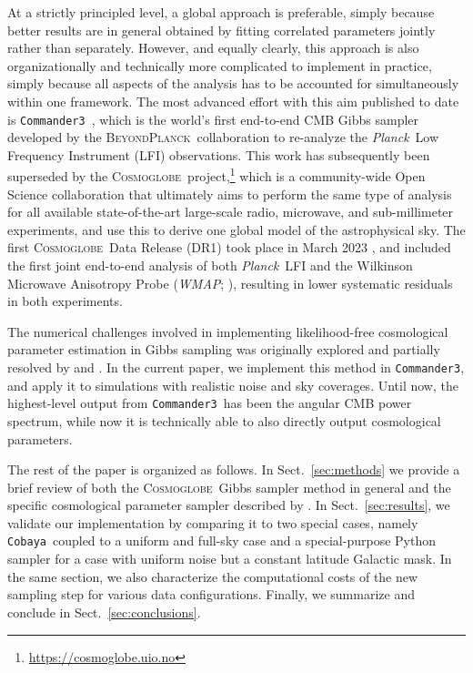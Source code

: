 \documentclass[twocolumn]{../common/aa}
\def\WMAP{\emph{WMAP}}
\def\Planck{\emph{Planck}}
\def\commanderthree{\texttt{Commander3}}
\def\cobaya{\texttt{Cobaya}}
\newcommand{\BP}{\textsc{BeyondPlanck}}
\newcommand{\cosmoglobe}{\textsc{Cosmoglobe}}
\begin{document}
At a strictly principled level, a global approach is preferable, simply because better results are in general obtained by fitting correlated parameters jointly rather than separately. However, and equally clearly, this approach is also organizationally and technically more complicated to implement in practice, simply because all aspects of the analysis has to be accounted for simultaneously within one framework. The most advanced effort with this aim published to date is \commanderthree\ \citep{bp03}, which is the world's first end-to-end CMB Gibbs sampler developed by the \BP\ collaboration to re-analyze the \Planck\ Low Frequency Instrument (LFI) observations. This work has subsequently been superseded by the \cosmoglobe\ project,\footnote{\url{https://cosmoglobe.uio.no}} which is a community-wide Open Science collaboration that ultimately aims to perform the same type of analysis for all available state-of-the-art large-scale radio, microwave, and sub-millimeter experiments, and use this to derive one global model of the astrophysical sky. The first \cosmoglobe\ Data Release (DR1) took place in March 2023 \citep{watts2023_dr1}, and included the first joint end-to-end analysis of both \Planck\ LFI and the Wilkinson Microwave Anisotropy Probe (\WMAP; \citealp{bennett2012}), resulting in lower systematic residuals in both experiments.

The numerical challenges involved in implementing likelihood-free cosmological parameter estimation in Gibbs sampling was originally explored and partially resolved by \citet{jewell:2009} and \citet{racine:2016}. In the current paper, we implement this method in \commanderthree, and apply it to simulations with realistic noise and sky coverages. Until now, the highest-level output from \commanderthree\ has been the angular CMB power spectrum, while now it is technically able to also directly output cosmological parameters.

The rest of the paper is organized as follows. In Sect.~\ref{sec:methods} we provide a brief review of both the \cosmoglobe\ Gibbs sampler method in general and the specific cosmological parameter sampler described by \citet{racine:2016}. In Sect.~\ref{sec:results}, we validate our implementation by comparing it to two special cases, namely \cobaya\ coupled to a uniform and full-sky case and a special-purpose Python sampler for a case with uniform noise but a constant latitude Galactic mask. In the same section, we also characterize the computational costs of the new sampling step for various data configurations. Finally, we summarize and conclude in Sect.~\ref{sec:conclusions}.
\end{document}
